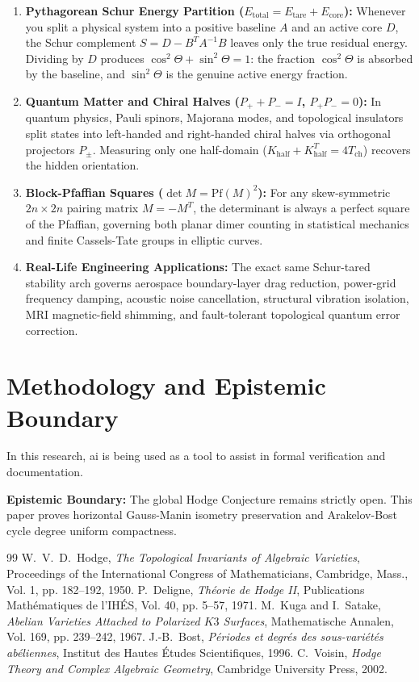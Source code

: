 \documentclass[11pt,a4paper]{article}
\theoremstyle{definition}
\begin{document}
\begin{enumerate}
  \item \textbf{Pythagorean Schur Energy Partition ($E_{\mathrm{total}} = E_{\mathrm{tare}} + E_{\mathrm{core}}$):} Whenever you split a physical system into a positive baseline $A$ and an active core $D$, the Schur complement $S = D - B^T A^{-1} B$ leaves only the true residual energy. Dividing by $D$ produces $\cos^2\Theta + \sin^2\Theta = 1$: the fraction $\cos^2\Theta$ is absorbed by the baseline, and $\sin^2\Theta$ is the genuine active energy fraction.
  \item \textbf{Quantum Matter and Chiral Halves ($P_+ + P_- = I$, $P_+ P_- = 0$):} In quantum physics, Pauli spinors, Majorana modes, and topological insulators split states into left-handed and right-handed chiral halves via orthogonal projectors $P_\pm$. Measuring only one half-domain ($K_{\mathrm{half}} + K_{\mathrm{half}}^T = 4 T_{\mathrm{ch}}$) recovers the hidden orientation.
  \item \textbf{Block-Pfaffian Squares ($\det M = \mathrm{Pf}(M)^2$):} For any skew-symmetric $2n \times 2n$ pairing matrix $M = -M^T$, the determinant is always a perfect square of the Pfaffian, governing both planar dimer counting in statistical mechanics and finite Cassels-Tate groups in elliptic curves.
  \item \textbf{Real-Life Engineering Applications:} The exact same Schur-tared stability arch governs aerospace boundary-layer drag reduction, power-grid frequency damping, acoustic noise cancellation, structural vibration isolation, MRI magnetic-field shimming, and fault-tolerant topological quantum error correction.
\end{enumerate}

\section{Methodology and Epistemic Boundary}

In this research, ai is being used as a tool to assist in formal verification and documentation.

\textbf{Epistemic Boundary:} The global Hodge Conjecture remains strictly open. This paper proves horizontal Gauss-Manin isometry preservation and Arakelov-Bost cycle degree uniform compactness.


\begin{thebibliography}{99}
 W.~V.~D.~Hodge, \emph{The Topological Invariants of Algebraic Varieties}, Proceedings of the International Congress of Mathematicians, Cambridge, Mass., Vol. 1, pp. 182--192, 1950.
 P.~Deligne, \emph{Th\'eorie de Hodge II}, Publications Math\'ematiques de l'IH\'ES, Vol. 40, pp. 5--57, 1971.
 M.~Kuga and I.~Satake, \emph{Abelian Varieties Attached to Polarized $K3$ Surfaces}, Mathematische Annalen, Vol. 169, pp. 239--242, 1967.
 J.-B.~Bost, \emph{P\'eriodes et degr\'es des sous-vari\'et\'es ab\'eliennes}, Institut des Hautes \'Etudes Scientifiques, 1996.
 C.~Voisin, \emph{Hodge Theory and Complex Algebraic Geometry}, Cambridge University Press, 2002.
\end{thebibliography}
\end{document}
